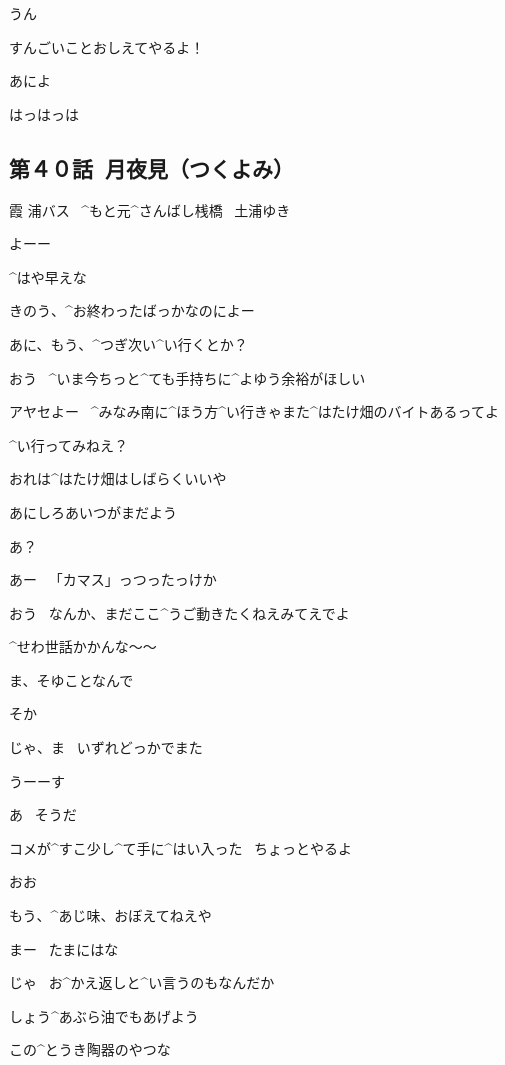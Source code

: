 \Makki うん

\Makki すんごいことおしえてやるよ！

\Takahiro あによ

\Makki はっはっは


\subsection{第４０話\ 月夜見（つくよみ）}

\page[116]
\Sign 霞 浦バス
\ ^{もと}{元}^{さんばし}{桟橋}
\ 土浦ゆき

\page[118]
\Person よーー

\Ayase ^{はや}{早}えな

\page
\Person きのう、^{お}{終}わったばっかなのによー

\Ayase あに、もう、^{つぎ}{次}い^{い}{行}くとか？

\Person おう
\ ^{いま}{今}ちっと^{ても}{手持}ちに^{よゆう}{余裕}がほしい

\Person アヤセよー
\ ^{みなみ}{南}に^{ほう}{方}^{い}{行}きゃまた^{はたけ}{畑}のバイトあるってよ

\Person ^{い}{行}ってみねえ？

\Ayase おれは^{はたけ}{畑}はしばらくいいや

\page
\Ayase あにしろあいつがまだよう

\Person あ？

\Person あー
\ 「カマス」っつったっけか

\Ayase おう
\ なんか、まだここ^{うご}{動}きたくねえみてえでよ

\page
\Person ^{せわ}{世話}かかんな〜〜

\Ayase ま、そゆことなんで

\Person そか

\Person じゃ、ま
\ いずれどっかでまた

\Ayase うーーす

\Person あ
\ そうだ

\page
\Person コメが^{すこ}{少}し^{て}{手}に^{はい}{入}った
\ ちょっとやるよ

\Ayase おお

\Ayase もう、^{あじ}{味}、おぼえてねえや

\Person まー
\ たまにはな

\Ayase じゃ
\ お^{かえ}{返}しと^{い}{言}うのもなんだか

\Ayase しょう^{あぶら}{油}でもあげよう

\Ayase この^{とうき}{陶器}のやつな

